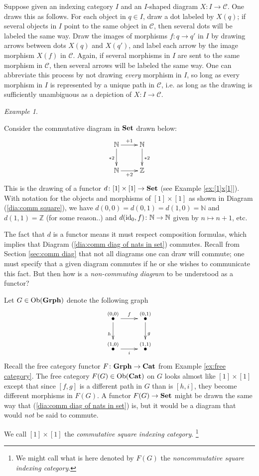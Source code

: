 \documentclass{book}
\def\tn{\textnormal}
\def\mc{\mathcal}
\def\ZZ{{\mathbb Z}}
\def\NN{{\mathbb N}}
\def\Ob{\tn{Ob}}
\def\to{\rightarrow}
\def\taking{\colon}
\newcommand{\LMO}[1]{\stackrel{#1}{\bullet}}
\def\id{\tn{id}}
\def\Cat{{\bf Cat}}
\def\Grph{{\bf Grph}}
\def\Set{{\bf Set}}
\def\mcC{\mc{C}}
\theoremstyle{remark}
\newtheorem{example}[subsubsection]{Example}
\theoremstyle{definition}
\begin{document}
Suppose given an indexing category $I$ and an $I$-shaped diagram $X\taking I\to\mcC$. One draws this as follows. For each object in $q\in I$, draw a dot labeled by $X(q)$; if several objects in $I$ point to the same object in $\mcC$, then several dots will be labeled the same way. Draw the images of morphisms $f\taking q\to q'$ in $I$ by drawing arrows between dots $X(q)$ and $X(q')$, and label each arrow by the image morphism $X(f)$ in $\mcC$. Again, if several morphisms in $I$ are sent to the same morphism in $\mcC$, then several arrows will be labeled the same way. One can abbreviate this process by not drawing {\em every} morphism in $I$, so long as every morphism in $I$ is represented by a unique path in $\mcC$, i.e. as long as the drawing is sufficiently unambiguous as a depiction of $X\taking I\to\mcC$.

\begin{example}\label{ex:comm vs noncomm diags}

Consider the commutative diagram in $\Set$ drawn below:
\begin{align}\label{dia:comm diag of nats in set}
\xymatrix{\NN\ar[r]^{+1}\ar[d]_{*2}&\NN\ar[d]^{*2}\\\NN\ar[r]_{+2}&\ZZ}
\end{align}
This is the drawing of a functor $d\taking[1]\times[1]\to\Set$ (see Example \ref{ex:[1]x[1]}). With notation for the objects and morphisms of $[1]\times[1]$ as shown in Diagram (\ref{dia:comm square}), we have $d(0,0)=d(0,1)=d(1,0)=\NN$ and $d(1,1)=\ZZ$ (for some reason..) and $d(\id_0,f)\taking\NN\to\NN$ given by $n\mapsto n+1$, etc. 

The fact that $d$ is a functor means it must respect composition formulas, which implies that Diagram (\ref{dia:comm diag of nats in set}) commutes. Recall from Section \ref{sec:comm diag} that not all diagrams one can draw will commute; one must specify that a given diagram commutes if he or she wishes to communicate this fact. But then how is a {\em non-commuting diagram} to be understood as a functor?

Let $G\in\Ob(\Grph)$ denote the following graph 
$$\xymatrix{\LMO{(0,0)}\ar[r]^f\ar[d]_h&\LMO{(0,1)}\ar[d]^{g}\\\LMO{(1,0)}\ar[r]_{i}&\LMO{(1,1)}}$$
Recall the free category functor $F\taking\Grph\to\Cat$ from Example \ref{ex:free category}. The free category $F(G)\in\Ob(\Cat)$ on $G$ looks almost like $[1]\times[1]$ except that since $[f,g]$ is a different path in $G$ than is $[h,i]$, they become different morphisms in $F(G)$. A functor $F(G)\to\Set$ might be drawn the same way that (\ref{dia:comm diag of nats in set}) is, but it would be a diagram that would {\em not} be said to commute.

We call $[1]\times [1]$ the {\em commutative square indexing category}. 
\footnote{We might call what is here denoted by $F(G)$ the {\em noncommutative square indexing category}.}

\end{example}
\end{document}
